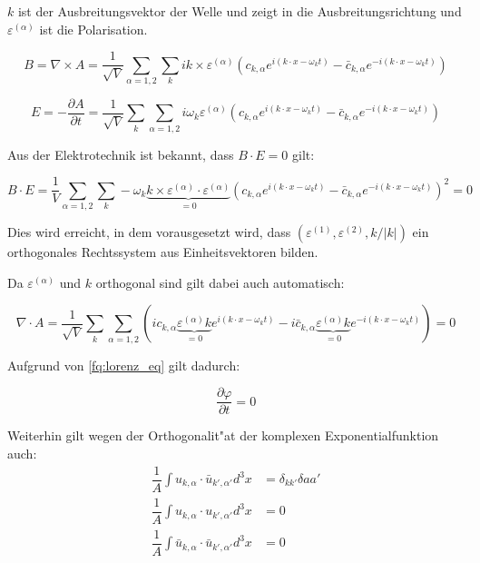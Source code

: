 $k$ ist der Ausbreitungsvektor der Welle und zeigt in die Ausbreitungsrichtung und $\varepsilon^{(\alpha)}$ ist die Polarisation. 

\begin{equation*}
B = \nabla \times A = \frac{1}{ \sqrt{V}} \sum_{\alpha=1,2}  \sum_k ik \times \varepsilon^{(\alpha)} \left(c_{k,\alpha} e^{i (k \cdot x - \omega_k t)} - \bar{c}_{k,\alpha} e^{-i(k \cdot x - \omega_k t)} \right)
\end{equation*}

\begin{equation*}
E = - \frac{\partial A}{\partial t} = \frac{1}{\sqrt{V}} \sum_k \sum_{\alpha=1,2} i \omega_k \varepsilon^{(\alpha)} \left(c_{k,\alpha} e^{i (k \cdot x - \omega_k t)} - \bar{c}_{k,\alpha} e^{-i(k \cdot x - \omega_k t)} \right)
\end{equation*}

Aus der Elektrotechnik ist bekannt, dass $B \cdot E = 0$ gilt:

\begin{equation*}
B \cdot E = \frac{1}{V} \sum_{\alpha=1,2}   \sum_k -\omega_k \underbrace{k \times  \varepsilon^{(\alpha)} \cdot \varepsilon^{(\alpha)}}_{=0} \left(c_{k,\alpha} e^{i (k \cdot x - \omega_k t)} - \bar{c}_{k,\alpha} e^{-i(k \cdot x - \omega_k t)}\right)^2 = 0
\end{equation*}

Dies wird erreicht, in dem vorausgesetzt wird, dass $(\varepsilon^{(1)}, \varepsilon^{(2)} , k/|k|)$ ein orthogonales Rechtssystem aus Einheitsvektoren bilden.

Da $\varepsilon^{(\alpha)}$ und $k$ orthogonal sind gilt dabei auch automatisch:

\begin{equation*}
\nabla \cdot A = \frac{1}{\sqrt{V}} \sum_k \sum_{\alpha=1,2} \left(i c_{k,\alpha} \underbrace{\varepsilon^{(\alpha)} k}_{=0} e^{i (k \cdot x - \omega_k t)} - i \bar{c}_{k,\alpha} \underbrace{\varepsilon^{(\alpha)} k}_{=0} e^{-i(k \cdot x - \omega_k t)}\right) = 0
\end{equation*}

Aufgrund von \ref{fq:lorenz_eq} gilt dadurch:

\begin{equation*}
\frac{\partial \varphi }{\partial t} = 0
\end{equation*}

Weiterhin gilt wegen der Orthogonalit"at der komplexen Exponentialfunktion auch:
\begin{align*}
\dfrac{1}{A} \int u_{k,\alpha} \cdot \bar{u}_{k',\alpha'} d^3 x &= \delta_{kk'}\delta{aa'} \\
\dfrac{1}{A} \int u_{k,\alpha} \cdot u_{k',\alpha'} d^3 x &= 0 \\
\dfrac{1}{A} \int \bar{u}_{k,\alpha} \cdot \bar{u}_{k',\alpha'} d^3 x &= 0
\end{align*}

